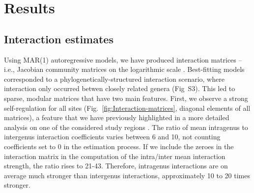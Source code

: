 \documentclass[10pt]{article}
\begin{document}
\section*{Results}
\subsection*{Interaction estimates}

Using MAR(1) autoregressive models, we have produced interaction matrices \citep{ives_estimating_2003,hampton2013quantifying}
-- i.e., Jacobian community matrices on the logarithmic scale \citep{ives_estimating_2003}.
Best-fitting models corresponded to a phylogenetically-structured
interaction scenario, where interaction only occurred betwen closely
related genera (Fig~S3). This led to sparse, modular
matrices that have two main features. First, we observe a strong self-regulation
for all sites (Fig.~\ref{fig:Interaction-matrices}, diagonal elements
of all matrices), a feature that we have previously highlighted in
a more detailed analysis on one of the considered study regions \citep{barraquand_coastal_2018}.
The ratio of mean intragenus to intergenus interaction coefficients
varies between 6 and 10, not counting coefficients set to 0 in the
estimation process. If we include the zeroes in the interaction matrix
in the computation of the intra/inter mean interaction strength, the
ratio rises to 21-43. Therefore, intragenus interactions are on average
much stronger than intergenus interactions, approximately 10 to 20
times stronger.
\end{document}
